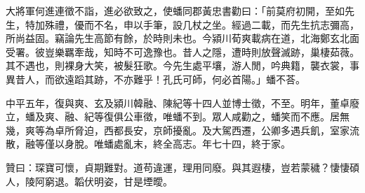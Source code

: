 \begin{pinyinscope}
大將軍何進連徵不詣，進必欲致之，使蟠同郡黃忠書勸曰：「前莫府初開，至如先生，特加殊禮，優而不名，申以手筆，設几杖之坐。經過二載，而先生抗志彌高，所尚益固。竊論先生高節有餘，於時則未也。今潁川荀爽載病在道，北海鄭玄北面受署。彼豈樂羈牽哉，知時不可逸豫也。昔人之隱，遭時則放聲滅跡，巢棲茹薇。其不遇也，則裸身大笑，被髮狂歌。今先生處平壤，游人閒，吟典籍，襲衣裳，事異昔人，而欲遠蹈其跡，不亦難乎！孔氏可師，何必首陽。」蟠不荅。

中平五年，復與爽、玄及潁川韓融、陳紀等十四人並博士徵，不至。明年，董卓廢立，蟠及爽、融、紀等復俱公車徵，唯蟠不到。眾人咸勸之，蟠笑而不應。居無幾，爽等為卓所脅迫，西都長安，京師擾亂。及大駕西遷，公卿多遇兵飢，室家流散，融等僅以身脫。唯蟠處亂末，終全高志。年七十四，終于家。

贊曰：琛寶可懷，貞期難對。道苟違運，理用同廢。與其遐棲，豈若蒙穢？悽悽碩人，陵阿窮退。韜伏明姿，甘是堙曖。


\end{pinyinscope}